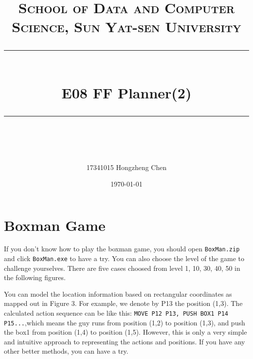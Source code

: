 \documentclass[a4paper, 11pt]{article}
\title{
\normalfont \normalsize
\textsc{School of Data and Computer Science, Sun Yat-sen University} \\ [25pt] %
\rule{\textwidth}{0.5pt} \\[0.4cm] %
\huge  E08 FF Planner(2)\\ %
\rule{\textwidth}{2pt} \\[0.5cm] %
\author{17341015 Hongzheng Chen}
\date{\normalsize\today}
}
\begin{document}
\maketitle
\tableofcontents
\newpage
\section{Boxman Game}
If you don't know how to play the boxman game, you should open \texttt{BoxMan.zip} and click \texttt{BoxMan.exe} to have a try.  You can also choose the level of the game to challenge yourselves. There are five cases choosed from level 1, 10, 30, 40, 50 in the following figures.

You can model the location information based on rectangular coordinates as mapped out in Figure 3. For example, we denote by P13 the position (1,3). The calculated action sequence can be like this: \texttt{MOVE P12 P13, PUSH BOX1 P14 P15...},which means the guy runs from position (1,2) to position (1,3), and push the box1 from position (1,4) to position (1,5). However, this is only a very simple and intuitive approach to representing the actions and positions. If you have any other better methods, you can have a try.
\end{document}
